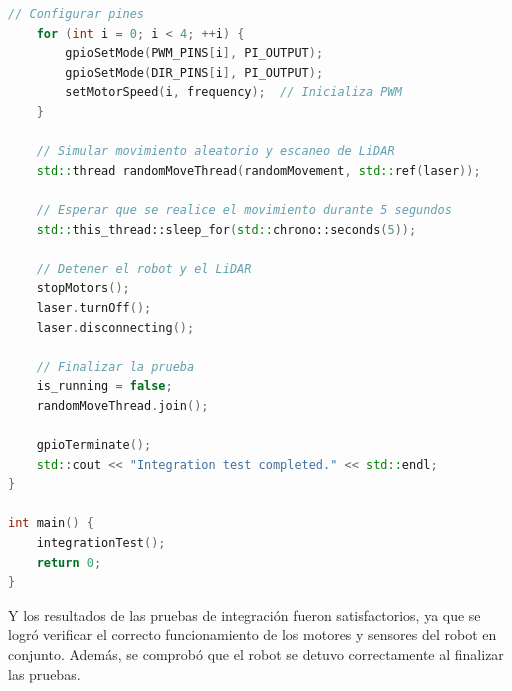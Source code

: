 \begin{lstlisting}[language={C++}, caption={main.cpp}, label={Camis}]
    // Configurar pines
    for (int i = 0; i < 4; ++i) {
        gpioSetMode(PWM_PINS[i], PI_OUTPUT);
        gpioSetMode(DIR_PINS[i], PI_OUTPUT);
        setMotorSpeed(i, frequency);  // Inicializa PWM
    }

    // Simular movimiento aleatorio y escaneo de LiDAR
    std::thread randomMoveThread(randomMovement, std::ref(laser));
    
    // Esperar que se realice el movimiento durante 5 segundos
    std::this_thread::sleep_for(std::chrono::seconds(5));
    
    // Detener el robot y el LiDAR
    stopMotors();
    laser.turnOff();
    laser.disconnecting();

    // Finalizar la prueba
    is_running = false;
    randomMoveThread.join();

    gpioTerminate();
    std::cout << "Integration test completed." << std::endl;
}

int main() {
    integrationTest();
    return 0;
}
        \end{lstlisting}
        \vskip 0.5cm
        Y los resultados de las pruebas de integraci\'on fueron satisfactorios, ya que se logr\'o verificar el correcto funcionamiento de los motores y sensores 
        del robot en conjunto. Adem\'as, se comprob\'o que el robot se detuvo correctamente al finalizar las pruebas.
        \vskip 0.5cm
